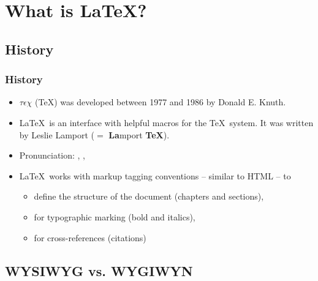 \section{What is \LaTeX ?}

\subsection{History}

\begin{frame}
\frametitle{History}

\begin{itemize}
	\item $\tau \epsilon \chi$ (\TeX ) was developed between 1977 and 1986 by Donald E. Knuth.
	
	\item \LaTeX\ is an interface with helpful macros for the \TeX\ system. It was written by Leslie Lamport ($=$ \textbf{La}mport \textbf{\TeX }). 
	
	\item Pronunciation: \textipa{["la:.tE\c{c}]}, \textipa{["leI.tE\c{c}]}, 
	
	\item \LaTeX\ works with markup tagging conventions -- similar to HTML -- to 
	
	\begin{itemize}
		\item define the structure of the document (\fe chapters and sections),
		
		\item for typographic marking (\fe bold and italics), 
		
		\item for cross-references (\fe citations)
	\end{itemize}

\end{itemize}

\end{frame}


\subsection{WYSIWYG vs. WYGIWYN}


